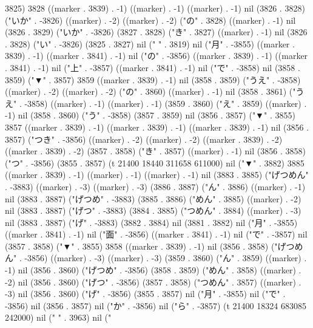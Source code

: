 3825) 3828 ((marker . 3839) . -1) ((marker) . -1) ((marker) . -1) nil (3826 . 3828) ("いか" . -3826) ((marker) . -2) ((marker) . -2) ("の" . 3828) ((marker) . -1) nil (3826 . 3829) ("いか" . -3826) (3827 . 3828) ("き" . 3827) ((marker) . -1) nil (3826 . 3828) ("い" . -3826) (3825 . 3827) nil ("
" . 3819) nil ("月" . -3855) ((marker . 3839) . -1) ((marker . 3841) . -1) nil ("の" . -3856) ((marker . 3839) . -1) ((marker . 3841) . -1) nil ("上" . -3857) ((marker . 3841) . -1) nil ("で" . -3858) nil (3858 . 3859) ("▼" . 3857) 3859 ((marker . 3839) . -1) nil (3858 . 3859) ("うえ" . -3858) ((marker) . -2) ((marker) . -2) ("の" . 3860) ((marker) . -1) nil (3858 . 3861) ("うえ" . -3858) ((marker) . -1) ((marker) . -1) (3859 . 3860) ("え" . 3859) ((marker) . -1) nil (3858 . 3860) ("う" . -3858) (3857 . 3859) nil (3856 . 3857) ("▼" . 3855) 3857 ((marker . 3839) . -1) ((marker . 3839) . -1) ((marker . 3839) . -1) nil (3856 . 3857) ("つき" . -3856) ((marker) . -2) ((marker) . -2) ((marker . 3839) . -2) ((marker . 3839) . -2) (3857 . 3858) ("き" . 3857) ((marker) . -1) nil (3856 . 3858) ("つ" . -3856) (3855 . 3857) (t 21400 18440 311658 611000) nil ("▼" . 3882) 3885 ((marker . 3839) . -1) ((marker) . -1) ((marker) . -1) nil (3883 . 3885) ("げつめん" . -3883) ((marker) . -3) ((marker) . -3) (3886 . 3887) ("ん" . 3886) ((marker) . -1) nil (3883 . 3887) ("げつめ" . -3883) (3885 . 3886) ("めん" . 3885) ((marker) . -2) nil (3883 . 3887) ("げつ" . -3883) (3884 . 3885) ("つめん" . 3884) ((marker) . -3) nil (3883 . 3887) ("げ" . -3883) (3882 . 3884) nil (3881 . 3882) nil ("月" . -3855) ((marker . 3841) . -1) nil ("面" . -3856) ((marker . 3841) . -1) nil ("で" . -3857) nil (3857 . 3858) ("▼" . 3855) 3858 ((marker . 3839) . -1) nil (3856 . 3858) ("げつめん" . -3856) ((marker) . -3) ((marker) . -3) (3859 . 3860) ("ん" . 3859) ((marker) . -1) nil (3856 . 3860) ("げつめ" . -3856) (3858 . 3859) ("めん" . 3858) ((marker) . -2) nil (3856 . 3860) ("げつ" . -3856) (3857 . 3858) ("つめん" . 3857) ((marker) . -3) nil (3856 . 3860) ("げ" . -3856) (3855 . 3857) nil ("月" . -3855) nil ("で" . -3856) nil (3856 . 3857) nil ("か" . -3856) nil ("ら" . -3857) (t 21400 18324 683085 242000) nil ("
" . 3963) nil ("
